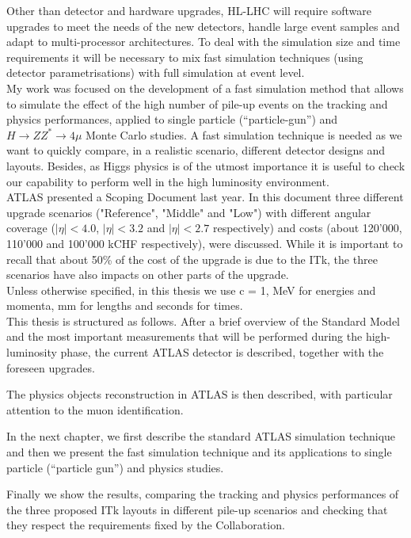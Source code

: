 \documentclass[a4paper,twoside,12pt]{book}
\begin{document}
Other than detector and hardware upgrades, HL-LHC will require software upgrades to meet the needs of the new detectors, handle large event samples and adapt to multi-processor
architectures. To deal with the simulation size and time requirements it will be necessary to mix fast simulation techniques (using detector parametrisations) with full simulation at event level.\\

My work was focused on the development of a fast simulation method that allows to simulate the effect of the high number of pile-up events on the tracking and physics performances, applied to single particle (``particle-gun'') and $H \rightarrow ZZ^{*} \rightarrow 4\mu$ Monte Carlo studies. A fast simulation technique is needed as we want to quickly compare, in a realistic scenario, different detector
designs and layouts. Besides, as Higgs physics is of the utmost importance it is useful to check our capability to perform well in the high luminosity environment.\\

ATLAS presented a Scoping Document\cite{scoping} last year. In this document three different upgrade scenarios ("Reference", "Middle" and "Low") with different angular coverage 
($|\eta| < 4.0$, $|\eta| < 3.2$ and $|\eta| < 2.7$ respectively) and costs (about 120'000, 110'000 and 100'000 kCHF respectively),  were discussed. While it is important to recall that about 50\% of the cost of the upgrade is due to the ITk, the three scenarios have
also impacts on other parts of the upgrade.\\

Unless otherwise specified, in this thesis we use c = 1, MeV for energies and momenta, mm for lengths and seconds for times. \\

This thesis is structured as follows. 
After a brief overview of the Standard Model and 
the most important measurements that will be performed during the high-luminosity phase,
the current ATLAS detector is described, together with the foreseen upgrades.

The physics objects reconstruction in ATLAS is then described, with particular attention to the
muon identification.

In the next chapter, we first describe the standard ATLAS simulation technique and then we present
the fast simulation technique and its applications to single particle (``particle gun'') and physics studies.

Finally we show the results, comparing the tracking and physics performances of the three proposed ITk layouts
in different pile-up scenarios and checking that they respect the requirements fixed by the
Collaboration.
\end{document}

